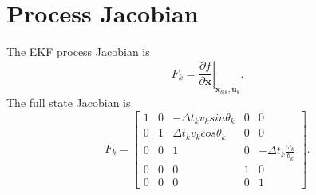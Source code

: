 \documentclass[11pt]{article}
\begin{document}
\section{Process Jacobian}

The EKF process Jacobian is
\begin{equation}
F_k =
\left.
\frac{\partial f}{\partial \mathbf{x}}
\right|_{\hat{\mathbf{x}}_{k|k},\mathbf{u}_k}.
\end{equation}
The full state Jacobian is
\begin{equation}
F_k =
\begin{bmatrix}
1 & 0 & -\Delta t_k v_k sin\theta_k & 0 & 0 \\
0 & 1 & \Delta t_k v_k cos\theta_k & 0 & 0 \\
0 & 0 & 1 & 0 &
-\Delta t_k \frac{\omega_k}{b_k}
\\
0 & 0 & 0 & 1 & 0
\\
0 & 0 & 0 & 0 & 1
\end{bmatrix}.
\end{equation}
\end{document}
